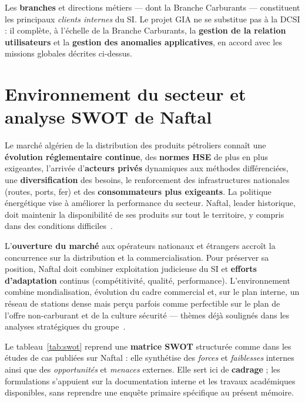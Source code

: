 Les \textbf{branches} et directions métiers — dont la Branche Carburants — constituent les
principaux \emph{clients internes} du SI. Le projet GIA ne se substitue pas à la DCSI : il
complète, à l'échelle de la Branche Carburants, la \textbf{gestion de la relation utilisateurs} et
la \textbf{gestion des anomalies applicatives}, en accord avec les missions globales décrites
ci-dessus.

\section{Environnement du secteur et analyse SWOT de Naftal}
Le marché algérien de la distribution des produits pétroliers connaît une \textbf{évolution
réglementaire continue}, des \textbf{normes HSE} de plus en plus exigeantes, l'arrivée
d'\textbf{acteurs privés} dynamiques aux méthodes différenciées, une \textbf{diversification}
des besoins, le renforcement des infrastructures nationales (routes, ports, fer) et des
\textbf{consommateurs plus exigeants}. La politique énergétique vise à améliorer la performance du
secteur. Naftal, leader historique, doit maintenir la disponibilité de ses produits sur tout le
territoire, y compris dans des conditions difficiles~\cite{ingrachen2016,meghari2014}.

L'\textbf{ouverture du marché} aux opérateurs nationaux et étrangers accroît la concurrence sur
la distribution et la commercialisation. Pour préserver sa position, Naftal doit combiner
exploitation judicieuse du SI et \textbf{efforts d'adaptation} continus (compétitivité, qualité,
performance). L'environnement combine mondialisation, évolution du cadre commercial et, sur le
plan interne, un réseau de stations dense mais perçu parfois comme perfectible sur le plan de
l'offre non-carburant et de la culture sécurité — thèmes déjà soulignés dans les analyses
stratégiques du groupe~\cite{meghari2014}.

Le tableau~\ref{tab:swot} reprend une \textbf{matrice SWOT} structurée comme dans les études de cas
publiées sur Naftal : elle synthétise des \emph{forces} et \emph{faiblesses} internes ainsi que
des \emph{opportunités} et \emph{menaces} externes. Elle sert ici de \textbf{cadrage} ; les
formulations s'appuient sur la documentation interne et les travaux académiques disponibles, sans
reprendre une enquête primaire spécifique au présent mémoire.

